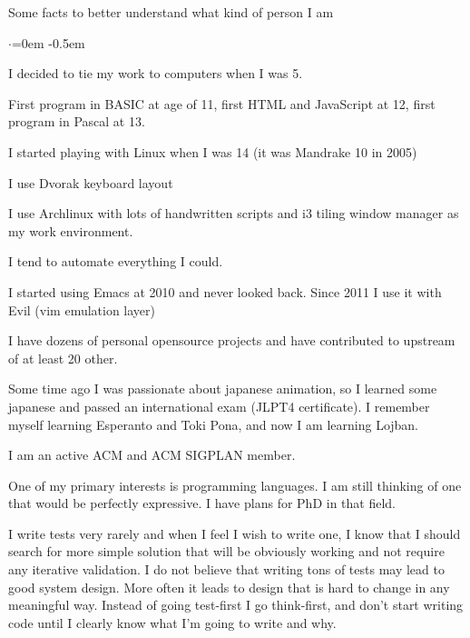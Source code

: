 \documentclass{resume} %
\begin{document}
\begin{rSection}{Some facts to better understand what kind of person I am}
  \smallskip
  \begin{list}{$\cdot$}{\leftmargin=0em} %
    \itemsep -0.5em \vspace{-0.5em} %
  \item I decided to tie my work to computers when I was 5.
  \item First program in BASIC at age of 11, first HTML and JavaScript at 12, first program in Pascal at 13.
  \item I started playing with Linux when I was 14 (it was Mandrake 10 in 2005)
  \item I use Dvorak keyboard layout
  \item I use Archlinux with lots of handwritten scripts and i3 tiling window manager as my work environment.
  \item I tend to automate everything I could.
  \item I started using Emacs at 2010 and never looked back. Since 2011 I use it with Evil (vim emulation layer)
  \item I have dozens of personal opensource projects and have contributed to
        upstream of at least 20 other.
  \item Some time ago I was passionate about japanese animation, so I learned
        some japanese and passed an international exam (JLPT4 certificate). I remember myself
        learning Esperanto and Toki Pona, and now I am learning Lojban.
  \item I am an active ACM and ACM SIGPLAN member.
  \item One of my primary interests is programming languages. I am still thinking of one
        that would be perfectly expressive. I have plans for PhD in that field.
  \item I write tests very rarely and when I feel I wish to write one, I know that
    I should search for more simple solution that will be obviously working and not
    require any iterative validation. I do not believe that writing tons
    of tests may lead to good system design. More often it leads to design that is hard to change
    in any meaningful way. Instead of going test-first I go think-first, and don't start writing
    code until I clearly know what I'm going to write and why.
  \end{list}
\end{rSection}
\end{document}
